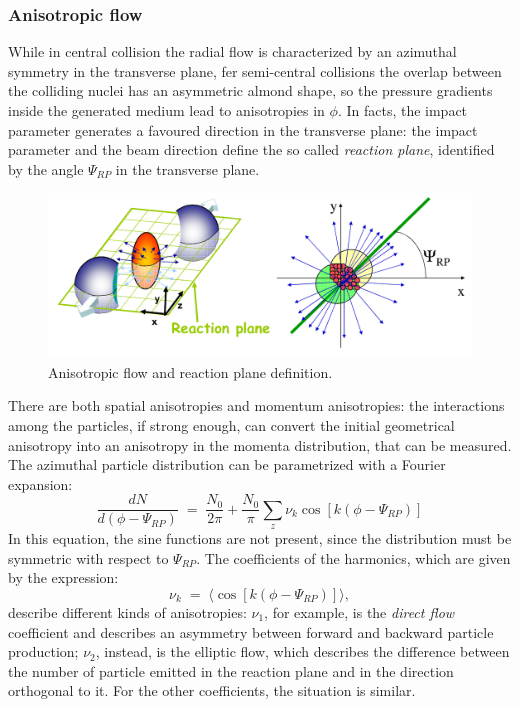 \subsubsection{Anisotropic flow}
While in central collision the radial flow is characterized by an azimuthal symmetry in the transverse plane, fer semi-central collisions the overlap between the colliding nuclei has an asymmetric almond shape, so the pressure gradients inside the generated medium lead to anisotropies in $\phi$. In facts, the impact parameter generates a favoured direction in the transverse plane: the impact parameter and the beam direction define the so called \textit{reaction plane}, identified by the angle $\Psi_{RP}$ in the transverse plane.\\
%
\begin{figure}
  \centering
  \includegraphics[scale=0.3]{figures/flow.png}
  \caption{Anisotropic flow and reaction plane definition.}
  \label{fig:flow}
\end{figure}
%
There are both spatial anisotropies and momentum anisotropies: the interactions among the particles, if strong enough, can convert the initial geometrical anisotropy into an anisotropy in the momenta distribution, that can be measured.\\
The azimuthal particle distribution can be parametrized with a Fourier expansion:
\begin{equation}
 \frac{dN}{d(\phi-\Psi_{RP})}\;=\;\frac{N_{0}}{2\pi} + \frac{N_{0}}{\pi}\sum_{z} \nu_{k}\cos[k(\phi-\Psi_{RP})]
\end{equation}
In this equation, the sine functions are not present, since the distribution must be symmetric with respect to $\Psi_{RP}$.
The coefficients of the harmonics, which are given by the expression:
\begin{equation}
 \nu_{k}\;=\;\langle \cos[k(\phi-\Psi_{RP})]\rangle,
\end{equation}
describe different kinds of anisotropies: $\nu_{1}$, for example, is the \textit{direct flow} coefficient and describes an asymmetry between forward and backward particle production; $\nu_{2}$, instead, is the elliptic flow, which describes the difference between the number of particle emitted in the reaction plane and in the direction orthogonal to it. For the other coefficients, the situation is similar.\\
